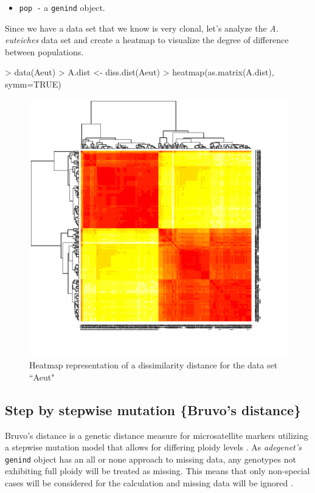 \documentclass[letterpaper]{article}
\newcommand{\tab}{\hspace*{1em}}
\begin{document}
\begin{itemize}
  \item \texttt{pop -} a \texttt{genind} object. 
\end{itemize}
Since we have a data set that we know is very clonal, let's analyze the \textit{A. euteiches} data set \cite{Grunwald:2006} and create a heatmap to visualize the degree of difference between populations.
\begin{Schunk}
\begin{Sinput}
> data(Aeut)
> A.dist <- diss.dist(Aeut)
> heatmap(as.matrix(A.dist), symm=TRUE)
\end{Sinput}
\end{Schunk}
\begin{figure}[h!]
  \centering
  \caption{\footnotesize Heatmap representation of a dissimilarity distance for the data set ``Aeut"}
  \label{diss_heat_map}
\includegraphics{poppr_manual-112}
\end{figure}
\newpage
\subsection{Step by stepwise mutation \{Bruvo's distance\}}\label{index:bruvo}

\tab\tab Bruvo's distance is a genetic distance measure for microsatellite markers utilizing a stepwise mutation model that allows for differing ploidy levels \cite{Bruvo:2004}. As \textit{adegenet's} \texttt{genind} object has an all or none approach to missing data, any genotypes not exhibiting full ploidy will be treated as missing. This means that only non-special cases will be considered for the calculation and missing data will be ignored \cite{Bruvo:2004}.
\end{document}
